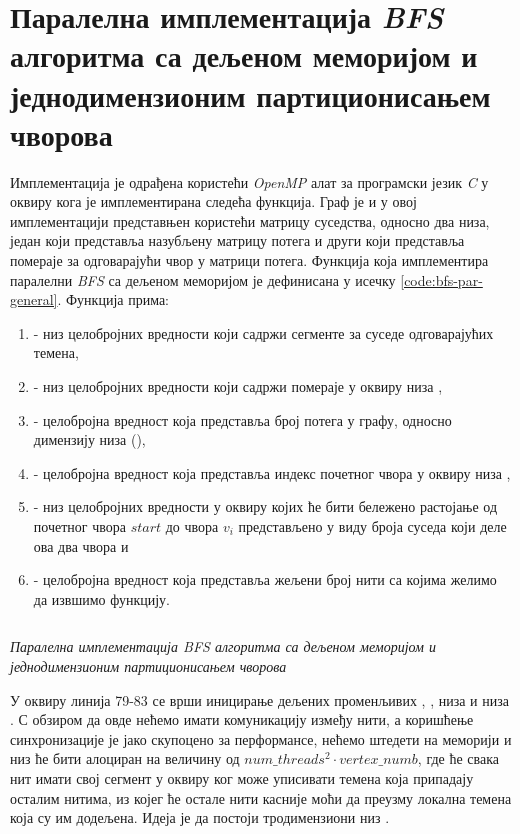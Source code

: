 \section{Паралелна имплементација \textit{BFS} алгоритма са дељеном меморијом и једнодимензионим партиционисањем чворова}
Имплементација је одрађена користећи \textit{OpenMP} алат за програмски језик \textit{C} у оквиру кога је имплементирана следећа функција. Граф је и у овој имплементацији представњен користећи матрицу суседства, односно два низа, један који представља назубљену матрицу потега и други који представља помераје за одговарајући чвор у матрици потега. Функција која имплементира паралелни \textit{BFS} са дељеном меморијом је дефинисана у исечку \ref{code:bfs-par-general}. Функција  прима:
\begin{enumerate}
    \item {} - низ целобројних вредности који садржи сегменте за суседе одговарајућих темена,
    \item {} - низ целобројних вредности који садржи помераје у оквиру низа ,
    \item {} - целобројна вредност која представља број потега у графу, односно димензију низа  (),
    \item {} - целобројна вредност која представља индекс почетног чвора у оквиру низа ,
    \item {} - низ целобројних вредности у оквиру којих ће бити бележено растојање од почетног чвора $start$ до чвора $v_i$ представљено у виду броја суседа који деле ова два чвора и
    \item {} - целобројна вредност која представља жељени број нити са којима желимо да извшимо функцију.
\end{enumerate}

\begin{listing}[H]
\inputminted[fontsize={\fontsize{6}{6}\selectfont},firstline=71,lastline=162]{c}{kodovi/bfs-par-general-1d.c}
\caption{\textit{Паралелна имплементација \textit{BFS} алгоритма са дељеном меморијом и једнодимензионим партиционисањем чворова}}
\label{code:bfs-par-general}
\end{listing}

\par
У оквиру линија 79-83 се врши иницирање дељених променљивих , , низа  и низа . С обзиром да овде нећемо имати комуникацију између нити, а коришћење синхронизације је јако скупоцено за перформансе, нећемо штедети на меморији и низ  ће бити алоциран на величину од $num\_threads^2 \cdot vertex\_numb$, где ће свака нит имати свој сегмент у оквиру ког може уписивати темена која припадају осталим нитима, из којег ће остале нити касније моћи да преузму локална темена која су им додељена. Идеја је да постоји тродимензиони низ .

